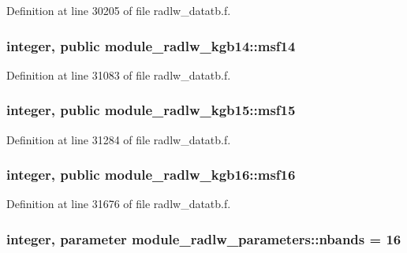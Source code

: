 Definition at line 30205 of file radlw\+\_\+datatb.\+f.

\subsubsection[{\texorpdfstring{msf14}{msf14}}]{\setlength{\rightskip}{0pt plus 5cm}integer, public module\+\_\+radlw\+\_\+kgb14\+::msf14}\hypertarget{group__module__radlw__main_ga37c15d52e45cd6b36dc246a059b0c5ca}{}\label{group__module__radlw__main_ga37c15d52e45cd6b36dc246a059b0c5ca}


Definition at line 31083 of file radlw\+\_\+datatb.\+f.

\subsubsection[{\texorpdfstring{msf15}{msf15}}]{\setlength{\rightskip}{0pt plus 5cm}integer, public module\+\_\+radlw\+\_\+kgb15\+::msf15}\hypertarget{group__module__radlw__main_gae1b588ee60974c2d451c89f842601e07}{}\label{group__module__radlw__main_gae1b588ee60974c2d451c89f842601e07}


Definition at line 31284 of file radlw\+\_\+datatb.\+f.

\subsubsection[{\texorpdfstring{msf16}{msf16}}]{\setlength{\rightskip}{0pt plus 5cm}integer, public module\+\_\+radlw\+\_\+kgb16\+::msf16}\hypertarget{group__module__radlw__main_ga8601911604c1d6a1b32e434159ae95d2}{}\label{group__module__radlw__main_ga8601911604c1d6a1b32e434159ae95d2}


Definition at line 31676 of file radlw\+\_\+datatb.\+f.

\subsubsection[{\texorpdfstring{nbands}{nbands}}]{\setlength{\rightskip}{0pt plus 5cm}integer, parameter module\+\_\+radlw\+\_\+parameters\+::nbands = 16}\hypertarget{group__module__radlw__main_ga48e11b992a80595d71c92f7c9bfbe19c}{}\label{group__module__radlw__main_ga48e11b992a80595d71c92f7c9bfbe19c}



